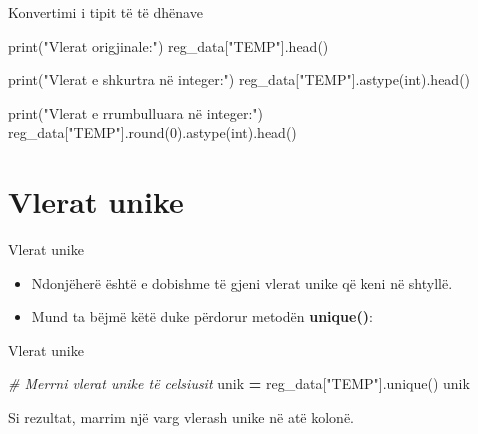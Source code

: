 \documentclass[
  ignorenonframetext,
]{beamer}
\newenvironment{Shaded}{\begin{snugshade}}{\end{snugshade}}
\newcommand{\BuiltInTok}[1]{#1}
\newcommand{\CommentTok}[1]{\textcolor[rgb]{0.56,0.35,0.01}{\textit{#1}}}
\newcommand{\DecValTok}[1]{\textcolor[rgb]{0.00,0.00,0.81}{#1}}
\newcommand{\NormalTok}[1]{#1}
\newcommand{\OperatorTok}[1]{\textcolor[rgb]{0.81,0.36,0.00}{\textbf{#1}}}
\newcommand{\StringTok}[1]{\textcolor[rgb]{0.31,0.60,0.02}{#1}}
\begin{document}
\begin{frame}[fragile]{Konvertimi i tipit të të dhënave}
\protect\hypertarget{konvertimi-i-tipit-tuxeb-tuxeb-dhuxebnave-4}{}
\begin{Shaded}
\begin{Highlighting}[]
\BuiltInTok{print}\NormalTok{(}\StringTok{"Vlerat origjinale:"}\NormalTok{)}
\NormalTok{reg\_data[}\StringTok{"TEMP"}\NormalTok{].head()}
\end{Highlighting}
\end{Shaded}

\begin{Shaded}
\begin{Highlighting}[]
\BuiltInTok{print}\NormalTok{(}\StringTok{"Vlerat e shkurtra në integer:"}\NormalTok{)}
\NormalTok{reg\_data[}\StringTok{"TEMP"}\NormalTok{].astype(}\BuiltInTok{int}\NormalTok{).head()}
\end{Highlighting}
\end{Shaded}

\begin{Shaded}
\begin{Highlighting}[]
\BuiltInTok{print}\NormalTok{(}\StringTok{"Vlerat e rrumbulluara në integer:"}\NormalTok{)}
\NormalTok{reg\_data[}\StringTok{"TEMP"}\NormalTok{].}\BuiltInTok{round}\NormalTok{(}\DecValTok{0}\NormalTok{).astype(}\BuiltInTok{int}\NormalTok{).head()}
\end{Highlighting}
\end{Shaded}
\end{frame}

\hypertarget{vlerat-unike}{%
\section{Vlerat unike}\label{vlerat-unike}}

\begin{frame}{Vlerat unike}
\protect\hypertarget{vlerat-unike-1}{}
\begin{itemize}
\item
  Ndonjëherë është e dobishme të gjeni vlerat unike që keni në shtyllë.
\item
  Mund ta bëjmë këtë duke përdorur metodën \textbf{unique()}:
\end{itemize}
\end{frame}

\begin{frame}[fragile]{Vlerat unike}
\protect\hypertarget{vlerat-unike-2}{}
\begin{Shaded}
\begin{Highlighting}[]
\CommentTok{\# Merrni vlerat unike të celsiusit}
\NormalTok{unik }\OperatorTok{=}\NormalTok{ reg\_data[}\StringTok{"TEMP"}\NormalTok{].unique()}
\NormalTok{unik}
\end{Highlighting}
\end{Shaded}

Si rezultat, marrim një varg vlerash unike në atë kolonë.
\end{frame}
\end{document}

